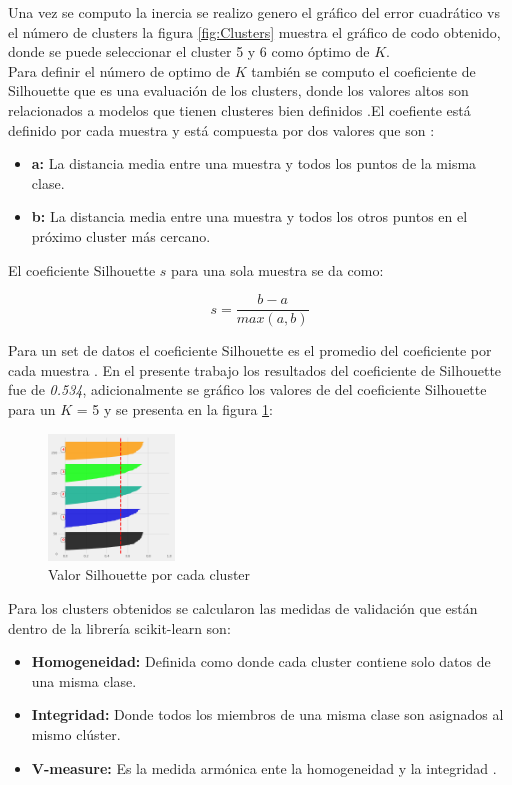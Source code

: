 Una vez se computo la inercia se realizo genero el gráfico del error cuadrático vs el número de clusters  la figura \ref{fig:Clusters} muestra el gráfico de codo obtenido, donde se puede seleccionar el cluster 5 y 6 como óptimo de $K$.\\

Para definir el número de optimo de $K$ también se computo el coeficiente de Silhouette que es una evaluación de los clusters, donde los valores altos son relacionados a modelos que tienen clusteres bien definidos .El coefiente está definido por cada muestra y está compuesta por dos valores que son \cite{scikit-learn,Rousseeuw1987}:

\begin{itemize}
	\item \textbf{a:} La distancia media entre una muestra y todos los puntos de la misma clase.
	\item \textbf{b:} La distancia media entre una muestra y todos los otros puntos en el próximo cluster más cercano.
\end{itemize}

El coeficiente Silhouette $s$ para una sola muestra se da como:

$$s = \frac{b-a}{max(a,b)}$$

Para un set de datos el coeficiente Silhouette es el promedio del coeficiente por cada muestra \cite{scikit-learn,Rousseeuw1987}. En el presente trabajo los resultados del coeficiente de Silhouette fue de  \textit{0.534}, adicionalmente se gráfico los valores de del coeficiente Silhouette para un $K$ = 5 y se presenta en la figura \ref{fig:S}:

\begin{figure}[H] 
	\centering
	\includegraphics[width=0.3\textwidth]{Kap4/S}
	\caption{Valor Silhouette por cada cluster} 
	\label{fig:S}
\end{figure}

Para los clusters obtenidos se calcularon las medidas de validación que están dentro de la librería scikit-learn \cite{scikit-learn} son:

\begin{itemize}
	\item  \textbf{Homogeneidad:} Definida como donde cada cluster contiene solo datos de una misma clase.
	\item \textbf{Integridad:} Donde todos los miembros de una misma clase son asignados al mismo clúster.	
	\item \textbf{V-measure:} Es la medida armónica ente la homogeneidad y la integridad \cite{Rosenberg2007}. 		
\end{itemize}

